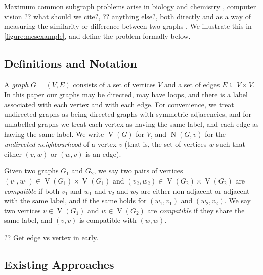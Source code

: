 \documentclass{llncs}
\begin{document}
Maximum common subgraph problems arise in biology and chemistry
\cite{DBLP:journals/jcamd/RaymondW02a,Ehrlich:2011}, computer vision ?? what should we cite?, ??
anything else?, both directly and as a way of measuring the similarity or difference between two
graphs \cite{DBLP:journals/prl/Bunke97,DBLP:journals/prl/FernandezV01,KriegeThesis}. We illustrate
this in \cref{figure:mcsexample}, and define the problem formally below.

\subsection{Definitions and Notation}

A \emph{graph} $G = (V, E)$ consists of a set of vertices $V$ and a set of edges $E \subseteq V
\times V$. In this paper our graphs may be directed, may have loops, and there is a label associated
with each vertex and with each edge. For convenience, we treat undirected graphs as being directed
graphs with symmetric adjacencies, and for unlabelled graphs we treat each vertex as having the same
label, and each edge as having the same label. We write $\operatorname{V}(G)$ for $V$, and
$\operatorname{N}(G, v)$ for the \emph{undirected neighbourhood} of a vertex $v$ (that is, the set
of vertices $w$ such that either $(v, w)$ or $(w, v)$ is an edge).

Given two graphs $G_1$ and $G_2$, we say two pairs of vertices $(v_1, w_1) \in \operatorname{V}(G_1)
\times \operatorname{V}(G_1)$ and $(v_2, w_2) \in \operatorname{V}(G_2) \times
\operatorname{V}(G_2)$ are \emph{compatible} if both $v_1$ and $w_1$ and $v_2$ and $w_2$ are either
non-adjacent or adjacent with the same label, and if the same holds for $(w_1, v_1)$ and $(w_2,
v_2)$.  We say two vertices $v \in \operatorname{V}(G_1)$ and $w \in \operatorname{V}(G_2)$ are
\emph{compatible} if they share the same label, and $(v, v)$ is compatible with $(w, w)$.

?? Get edge vs vertex in early.

\subsection{Existing Approaches}
\end{document}
